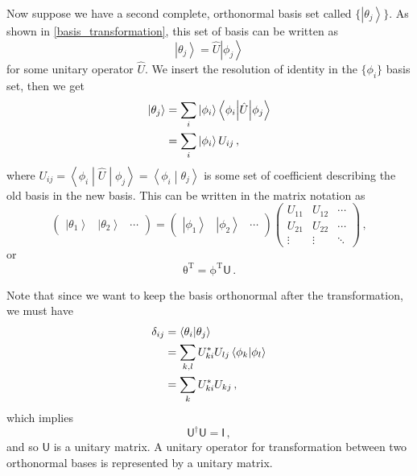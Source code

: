 \documentclass{article}
\theoremstyle{plain}\theoremheaderfont{\normalfont\itshape}\theorembodyfont{\rmfamily}\theoremseparator{.}\newtheorem*{rem}{Remark}\newtheorem*{ex}{Example}\newtheorem*{proof}{Proof}\newtheorem*{altp}{Alternative proof}
\theoremstyle{plain}\theoremheaderfont{\normalfont\bfseries}\theorembodyfont{\rmfamily}\theoremseparator{.}\newtheorem{thm}{Theorem}[section]\newtheorem{lem}[thm]{Lemma}\newtheorem{prop}[thm]{Proposition}\newtheorem*{cor}{Corollary}\newtheorem{defn}[thm]{Definition}\newtheorem{clm}[thm]{Claim}\newtheorem{clminproof}{Claim}
\theoremstyle{break}\theoremheaderfont{\normalfont\itshape}\theorembodyfont{\rmfamily}\theoremseparator{.\medskip}\newtheorem*{proofskip}{Proof}\newtheorem*{exs}{Examples}\newtheorem*{rems}{Remarks}
\theoremstyle{break}\theoremheaderfont{\normalfont\bfseries}\theorembodyfont{\rmfamily}\theoremseparator{.\medskip}\newtheorem{lemskip}[thm]{Lemma}\newtheorem{defnskip}[thm]{Definition}\newtheorem{propskip}[thm]{Proposition}\newtheorem{thmskip}[thm]{Theorem}
\numberwithin{equation}{section}
\newcommand{\tp}{^\mathrm{T}}
\newcommand{\ket}[1]{\left| #1 \right\rangle}
\newcommand{\braket}[2]{\left\langle #1 \middle| #2 \right\rangle}
\newcommand{\mel}[3]{\left\langle #1 \middle| #2 \middle| #3 \right\rangle}
\newcommand{\vb}[1]{\bm{\mathrm{#1}}}
\begin{document}
    Now suppose we have a second complete, orthonormal basis set called \(\{\ket{\theta_j}\}\). As shown in \cref{basis_transformation}, this set of basis can be written as
    \begin{equation}
        \ket{\theta_j}=\hat{U}\ket{\phi_j}
    \end{equation}
    for some unitary operator \(\hat{U}\). We insert the resolution of identity in the \(\{\phi_i\}\) basis set, then we get
    \begin{align}
        \ket{\theta_j}&=\sum_{i}\ket{\phi_i}\mel{\phi_i}{\hat{U}}{\phi_j}\notag\\
        &=\sum_{i}\ket{\phi_i}U_{ij}\,,
    \end{align}
    where \(U_{ij}=\mel{\phi_i}{\hat{U}}{\phi_j}=\braket{\phi_i}{\theta_j}\) is some set of coefficient describing the old basis in the new basis. This can be written in the matrix notation as
    \begin{equation}
        \begin{pmatrix}
            \ket{\theta_1} & \ket{\theta_2} & \cdots
        \end{pmatrix}=\begin{pmatrix}
            \ket{\phi_1} & \ket{\phi_2} & \cdots
        \end{pmatrix}
        \begin{pmatrix}
            U_{11} & U_{12} & \cdots \\
            U_{21} & U_{22} & \cdots \\
            \vdots & \vdots & \ddots
        \end{pmatrix}\,,
    \end{equation}
    or
    \begin{equation}
        \vb{\theta}\tp=\vb{\phi}\tp\mathsf{U}\,.
    \end{equation}

    Note that since we want to keep the basis orthonormal after the transformation, we must have
    \begin{align}
        \delta_{ij}&=\braket{\theta_i}{\theta_j}\notag\\
        &=\sum_{k,l}U_{ki}^*U_{lj}\braket{\phi_k}{\phi_l}\notag\\
        &=\sum_k U_{ki}^* U_{kj}\,,
    \end{align}
    which implies
    \begin{equation}
        \mathsf{U}^\dagger\mathsf{U}=\mathsf{I}\,,
    \end{equation}
    and so \(\mathsf{U}\) is a unitary matrix. A unitary operator for transformation between two orthonormal bases is represented by a unitary matrix.
\end{document}
